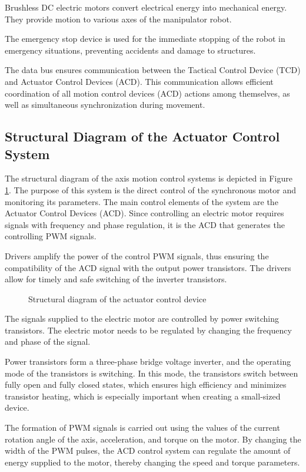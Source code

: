 Brushless DC electric motors convert electrical energy into mechanical energy. They provide motion to various axes of the manipulator robot.

The emergency stop device is used for the immediate stopping of the robot in emergency situations, preventing accidents and damage to structures.

The data bus ensures communication between the Tactical Control Device (TCD) and Actuator Control Devices (ACD). This communication allows efficient coordination of all motion control devices (ACD) actions among themselves, as well as simultaneous synchronization during movement.

\subsection{Structural Diagram of the Actuator Control System}

The structural diagram of the axis motion control systems is depicted in Figure \ref{ACD}. The purpose of this system is the direct control of the synchronous motor and monitoring its parameters. The main control elements of the system are the Actuator Control Devices (ACD). Since controlling an electric motor requires signals with frequency and phase regulation, it is the ACD that generates the controlling PWM signals.

Drivers amplify the power of the control PWM signals, thus ensuring the compatibility of the ACD signal with the output power transistors. The drivers allow for timely and safe switching of the inverter transistors.

\begin{figure}[H]
	\centering
	
	\caption{Structural diagram of the actuator control device}
	\label{ACD}
\end{figure}

The signals supplied to the electric motor are controlled by power switching transistors. The electric motor needs to be regulated by changing the frequency and phase of the signal.

Power transistors form a three-phase bridge voltage inverter, and the operating mode of the transistors is switching. In this mode, the transistors switch between fully open and fully closed states, which ensures high efficiency and minimizes transistor heating, which is especially important when creating a small-sized device.

The formation of PWM signals is carried out using the values of the current rotation angle of the axis, acceleration, and torque on the motor. By changing the width of the PWM pulses, the ACD control system can regulate the amount of energy supplied to the motor, thereby changing the speed and torque parameters.

